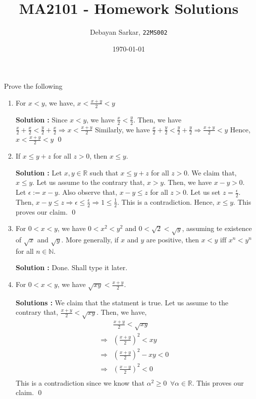 \documentclass[10pt]{article}
\title{MA2101 - Homework Solutions}
\author{Debayan Sarkar, \texttt{22MS002}}
\date{\today}
\newcommand{\nn}{\mathbb{N}}
\newcommand{\rn}{\mathbb{R}}
\begin{document}
\maketitle
Prove the following
\begin{enumerate}
	\item For $x<y$, we have, $x<\frac{x+y}{2}<y$

		\textbf{Solution : }Since $x < y$, we have $\frac{x}{2} < \frac{y}{2}$. Then, we have $\frac{x}{2} + \frac{x}{2} < \frac{y}{2} + \frac{x}{2} \Rightarrow x < \frac{x + y}{2}$
		Similarly, we have $\frac{x}{2} + \frac{y}{2} < \frac{y}{2} + \frac{y}{2}\Rightarrow \frac{x + y}{2} < y$
		Hence, $x < \frac{x + y}{2} < y$ \qed
	\item If $x \leq y + z$ for all $z > 0$, then $x \leq y$.

		\textbf{Solution : } Let $x,y \in \rn$ such that $x \leq y + z$ for all $z > 0$. We claim that, $x \leq y$. Let us assume to the contrary that, $x > y$. Then, we have $x - y > 0$. Let $\epsilon := x - y$. Also observe that, $x-y \leq z$ for all $z > 0$. Let us set $z = \frac{\epsilon}{2}$. Then, $x - y \leq z \Rightarrow \epsilon \leq \frac{\epsilon}{2} \Rightarrow 1 \leq \frac{1}{2}$. This is a contradiction. Hence, $x \leq y$. This proves our claim. \qed
	\item For $0 < x < y$, we have $0<x^2<y^2$ and $0<\sqrt{2}<\sqrt{y}$, assuming te existence of $\sqrt{x}$ and $\sqrt{y}$. More generally, if $x$ and $y$ are positive, then $x < y \text{ iff } x^n < y^n$ for all $n \in \nn$.
		
		\textbf{Solution : }Done. Shall type it later.
	\item For $0 < x < y$, we have $\sqrt{xy} < \frac{x + y}{2}$.

		\textbf{Solutions : }We claim that the statment is true. Let us assume to the contrary that, $\frac{x + y}{2} < \sqrt{xy}$. Then, we have, 
		\begin{align*}
			&\frac{x + y}{2} < \sqrt{xy} \\
			\Rightarrow &\left(\frac{x + y}{2}\right)^2 < xy \tag{Using the result from Problem 2}\\
			\Rightarrow &\left(\frac{x + y}{2}\right)^2 - xy < 0 \\
			\Rightarrow &\left(\frac{x - y}{2}\right)^2 < 0 \\
		\end{align*}
		This is a contradiction since we know that $\alpha^2 \geq 0 \,\,\, \forall \alpha \in \rn$. This proves our claim. \qed
\end{enumerate}
\end{document}
